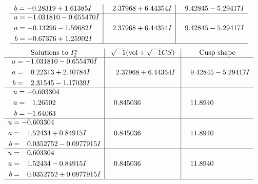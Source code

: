 \documentclass[1p]{elsarticle_modified}
\theoremstyle{definition}
\newcommand{\I}{\sqrt{-1}}
\begin{document}
$$\begin{array}{c|c|c}
\begin{aligned}
b &= -0.28319 + 1.61385 I\end{aligned}
 & \phantom{-}2.37968 + 6.44354 I & \phantom{-}9.42845 - 5.29417 I \\ \hline\begin{aligned}
u &= -1.031810 - 0.655470 I \\
a &= -0.13296 - 1.59682 I \\
b &= -0.67376 + 1.25902 I\end{aligned}
 & \phantom{-}2.37968 + 6.44354 I & \phantom{-}9.42845 - 5.29417 I\\
 \hline 
 \end{array}$$\newpage$$\begin{array}{c|c|c}  
\text{Solutions to }I^u_{2}& \I (\text{vol} + \sqrt{-1}CS) & \text{Cusp shape}\\
 \hline 
\begin{aligned}
u &= -1.031810 - 0.655470 I \\
a &= \phantom{-}0.22313 + 2.40784 I \\
b &= \phantom{-}2.31545 - 1.17039 I\end{aligned}
 & \phantom{-}2.37968 + 6.44354 I & \phantom{-}9.42845 - 5.29417 I \\ \hline\begin{aligned}
u &= -0.603304\phantom{ +0.000000I} \\
a &= \phantom{-}1.26502\phantom{ +0.000000I} \\
b &= -1.64063\phantom{ +0.000000I}\end{aligned}
 & \phantom{-}0.845036\phantom{ +0.000000I} & \phantom{-}11.8940\phantom{ +0.000000I} \\ \hline\begin{aligned}
u &= -0.603304\phantom{ +0.000000I} \\
a &= \phantom{-}1.52434 + 0.84915 I \\
b &= \phantom{-}0.0352752 - 0.0977915 I\end{aligned}
 & \phantom{-}0.845036\phantom{ +0.000000I} & \phantom{-}11.8940\phantom{ +0.000000I} \\ \hline\begin{aligned}
u &= -0.603304\phantom{ +0.000000I} \\
a &= \phantom{-}1.52434 - 0.84915 I \\
b &= \phantom{-}0.0352752 + 0.0977915 I\end{aligned}
 & \phantom{-}0.845036\phantom{ +0.000000I} & \phantom{-}11.8940\phantom{ +0.000000I}\\
 \hline 
 \end{array}$$\newpage\newpage\renewcommand{\arraystretch}{1}
\end{document}
